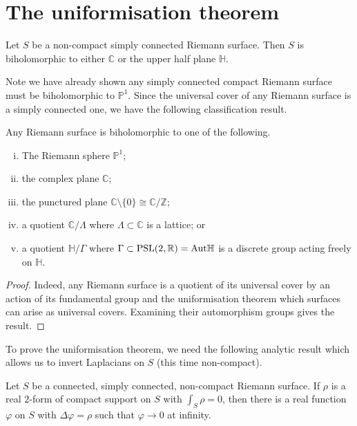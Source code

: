 \section{The uniformisation theorem}

\begin{theorem}
    Let \(S\) be a non-compact simply connected Riemann surface. Then \(S\) is
    biholomorphic to either \(\mathbb{C}\) or the upper half plane
    \(\mathbb{H}\).
\end{theorem}

Note we have already shown any simply connected compact Riemann surface must be
biholomorphic to \(\mathbb{P}^1\). Since the universal cover of any Riemann
surface is a simply connected one, we have the following classification result.

\begin{corollary}
    Any Riemann surface is biholomorphic to one of the following.
    \begin{enumerate}[(i)]
        \item The Riemann sphere \(\mathbb{P}^1\);
        \item the complex plane \(\mathbb{C}\);
        \item the punctured plane \(\mathbb{C}\setminus \{0\}\cong
            \mathbb{C}/\mathbb{Z}\);
        \item a quotient \(\mathbb{C}/\Lambda\) where \(\Lambda \subset
            \mathbb{C}\) is a lattice; or
        \item a quotient \(\mathbb{H}/\Gamma\) where \(\Gamma\subset
        \textnormal{PSL}(2,\mathbb{R})=\textnormal{Aut}\mathbb{H}\) is a
        discrete group acting freely on \(\mathbb{H}\).
    \end{enumerate}
    \begin{proof}
        Indeed, any Riemann surface is a quotient of its universal cover by an
        action of its fundamental group and the uniformisation theorem which
        surfaces can arise as universal covers. Examining their automorphism
        groups gives the result.
    \end{proof}
\end{corollary}

To prove the uniformisation theorem, we need the following analytic result which
allows us to invert Laplacians on \(S\) (this time non-compact).

\begin{theorem}
    Let \(S\) be a connected, simply connected, non-compact Riemann surface. If
    \(\rho\) is a real \(2\)-form of compact support on \(S\) with \(\int_S
    \rho = 0\), then there is a real function \(\varphi\) on \(S\) with
    \(\Delta \varphi = \rho\) such that \(\varphi \to 0\) at infinity.
\end{theorem}


